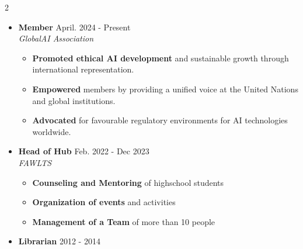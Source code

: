


\begin{cventries}
\begin{multicols}{2}
\raggedright
\footnotesize
\begin{itemize}[leftmargin=*,nosep,label={}]
    \item \textbf{Member} \hfill {\color{awesome-skyblue} April. 2024 - Present} \\
    \textit{GlobalAI Association} \\
    \begin{itemize}
    \item \textbf{Promoted ethical AI development} and sustainable growth through international representation. \\
    \item \textbf{Empowered} members by providing a unified voice at the United Nations and global institutions. \\
    \item \textbf{Advocated} for favourable regulatory environments for AI technologies worldwide. \\
    \end{itemize}
    \vspace{5pt}
    \item \textbf{Head of Hub} \hfill {\color{awesome-skyblue} Feb. 2022 - Dec 2023} \\
    \textit{FAWLTS} \\
    \begin{itemize}
    \item \textbf{Counseling and Mentoring} of highschool students
    \item \textbf{Organization of events} and activities \\
    \item \textbf{Management of a Team} of more than 10 people \\
    \end{itemize}
    \vspace{5pt}
    \item \textbf{Librarian} \hfill {\color{awesome-skyblue} 2012 - 2014} \\

\end{itemize}
\end{multicols}
\end{cventries}
